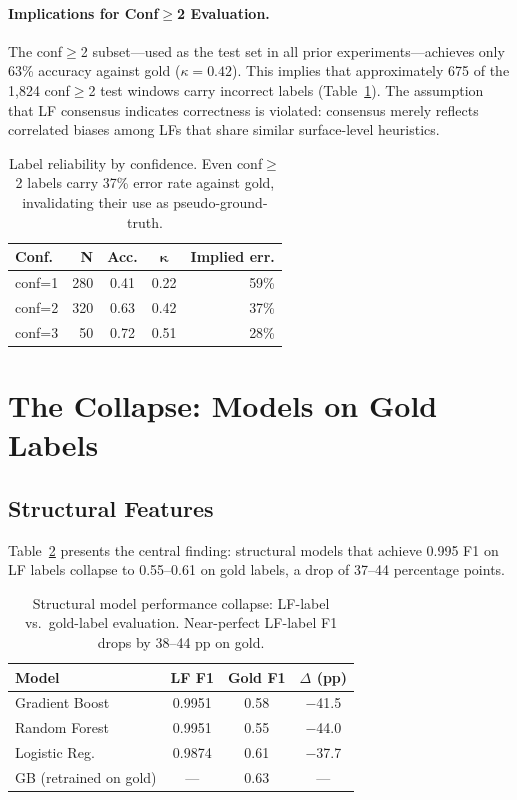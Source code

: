 \documentclass[11pt]{article}
\begin{document}
\paragraph{Implications for Conf$\geq$2 Evaluation.} The conf$\geq$2 subset---used as the test set in all prior experiments---achieves only 63\% accuracy against gold ($\kappa{=}0.42$). This implies that approximately 675 of the 1,824 conf$\geq$2 test windows carry incorrect labels (Table~\ref{tab:conf-reliability}). The assumption that LF consensus indicates correctness is violated: consensus merely reflects correlated biases among LFs that share similar surface-level heuristics.

\begin{table}[t]
\centering
\small
\begin{tabular}{lrccr}
\toprule
\textbf{Conf.} & \textbf{N} & \textbf{Acc.} & $\boldsymbol{\kappa}$ & \textbf{Implied err.} \\
\midrule
conf=1 & 280 & 0.41 & 0.22 & 59\% \\
conf=2 & 320 & 0.63 & 0.42 & 37\% \\
conf=3 &  50 & 0.72 & 0.51 & 28\% \\
\bottomrule
\end{tabular}
\caption{Label reliability by confidence. Even conf$\geq$2 labels carry 37\% error rate against gold, invalidating their use as pseudo-ground-truth.}
\label{tab:conf-reliability}
\end{table}

\section{The Collapse: Models on Gold Labels}
\label{sec:collapse}

\subsection{Structural Features}

Table~\ref{tab:structural-collapse} presents the central finding: structural models that achieve 0.995 F1 on LF labels collapse to 0.55--0.61 on gold labels, a drop of 37--44 percentage points.

\begin{table}[t]
\centering
\small
\begin{tabular}{lccc}
\toprule
\textbf{Model} & \textbf{LF F1} & \textbf{Gold F1} & \textbf{$\Delta$ (pp)} \\
\midrule
Gradient Boost & 0.9951 & 0.58 & $-$41.5 \\
Random Forest  & 0.9951 & 0.55 & $-$44.0 \\
Logistic Reg.  & 0.9874 & 0.61 & $-$37.7 \\
GB (retrained on gold) & --- & 0.63 & --- \\
\bottomrule
\end{tabular}
\caption{Structural model performance collapse: LF-label vs.\ gold-label evaluation. Near-perfect LF-label F1 drops by 38--44 pp on gold.}
\label{tab:structural-collapse}
\end{table}
\end{document}
